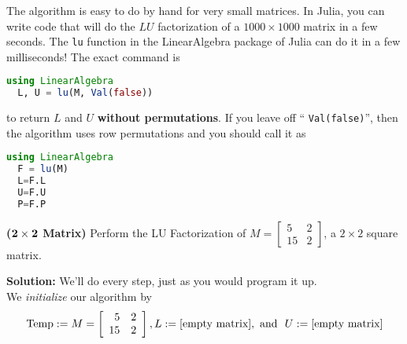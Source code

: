 The algorithm is easy to do by hand for very small matrices. In Julia, you can write code that will do the $LU$ factorization of a $1000 \times 1000$ matrix in a few seconds. The \texttt{lu} function in the LinearAlgebra package of Julia can do it in a few milliseconds! The exact command is\\

\begin{lstlisting}[language=Julia]
  using LinearAlgebra
  L, U = lu(M, Val(false))
\end{lstlisting}
to return $L$ and $U$ \textbf{without permutations}. If you leave off `` \texttt{Val(false)}'', then the algorithm uses row permutations and you should call it as 
\begin{lstlisting}[language=Julia]
  using LinearAlgebra
  F = lu(M)
  L=F.L
  U=F.U
  P=F.P
\end{lstlisting} 
\vspace*{0.2cm}

\begin{example}
\label{ex:Lu01} 
\textbf{(${\bf 2 \times 2}$ Matrix)} Perform the LU Factorization of $M=\left[\begin{array}{rr} 5 & 2\\
15 & 2 \end{array}\right]$, a $2 \times 2$ square matrix.
\end{example}

\textbf{Solution:}  We'll do every step, just as you would program it up.\\

We \textit{initialize} our algorithm by $${\rm Temp}:= M = \left[\begin{array}{rr} 5 & 2\\
15 & 2 \end{array}\right], L:=[\textrm{empty matrix}],~\text{and}~~ U:=[\textrm{empty matrix}]$$

